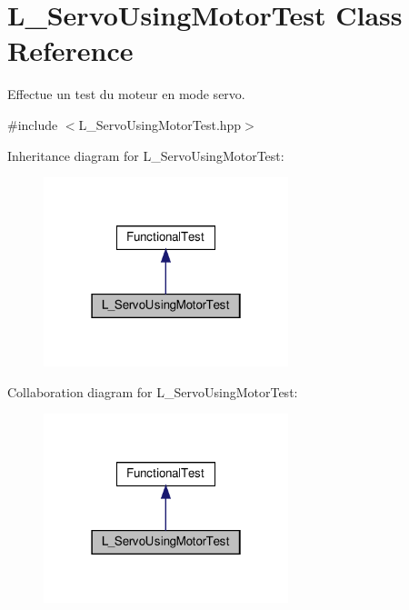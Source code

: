 \hypertarget{classL__ServoUsingMotorTest}{}\section{L\+\_\+\+Servo\+Using\+Motor\+Test Class Reference}
\label{classL__ServoUsingMotorTest}


Effectue un test du moteur en mode servo.  




{\ttfamily \#include $<$L\+\_\+\+Servo\+Using\+Motor\+Test.\+hpp$>$}



Inheritance diagram for L\+\_\+\+Servo\+Using\+Motor\+Test\+:
\nopagebreak
\begin{figure}[H]
\begin{center}
\leavevmode
\includegraphics[width=202pt]{classL__ServoUsingMotorTest__inherit__graph}
\end{center}
\end{figure}


Collaboration diagram for L\+\_\+\+Servo\+Using\+Motor\+Test\+:
\nopagebreak
\begin{figure}[H]
\begin{center}
\leavevmode
\includegraphics[width=202pt]{classL__ServoUsingMotorTest__coll__graph}
\end{center}
\end{figure}
